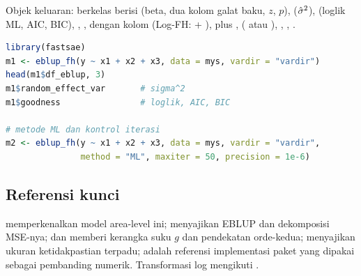Objek keluaran:  berkelas  berisi
 (beta, dua kolom galat baku, $z$, $p$), 
($\hat\sigma^2$),  (loglik ML, AIC, BIC), ,
,  dengan kolom  (Log-FH: + ),
plus ,  ( atau ),
, , .

\begin{lstlisting}[language=R,caption={Contoh yang dapat dijalankan (dari \texttt{man/eblup\_fh.Rd}; data \texttt{mys} berisi 42 domain, 10 di antaranya tanpa sampel).}]
library(fastsae)
m1 <- eblup_fh(y ~ x1 + x2 + x3, data = mys, vardir = "vardir")
head(m1$df_eblup, 3)
m1$random_effect_var       # sigma^2
m1$goodness                # loglik, AIC, BIC

# metode ML dan kontrol iterasi
m2 <- eblup_fh(y ~ x1 + x2 + x3, data = mys, vardir = "vardir",
               method = "ML", maxiter = 50, precision = 1e-6)
\end{lstlisting}

\subsection{Referensi kunci}\label{sec:fh-ref}

\citet{fay1979small} memperkenalkan model area-level ini;
\citet{rao2015small} menyajikan EBLUP dan dekomposisi MSE-nya;
\citet{prasad1990estimation} dan \citet{kackar1984approximations} memberi
kerangka suku $g$ dan pendekatan orde-kedua; \citet{datta2000unified}
menyajikan ukuran ketidakpastian terpadu; \citet{molina2015sae} adalah
referensi implementasi paket  yang dipakai sebagai pembanding
numerik. Transformasi log mengikuti \citet{slud2006mean}.
